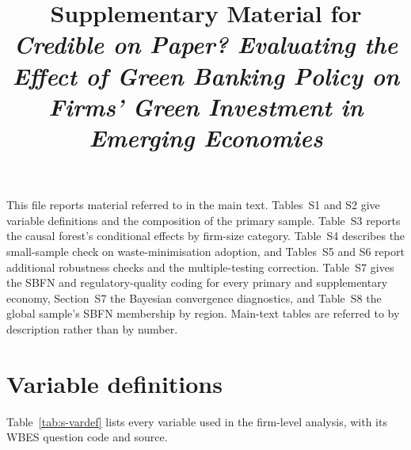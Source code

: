 \documentclass[12pt]{article}
\title{Supplementary Material for \\ \emph{Credible on Paper? Evaluating the Effect of Green Banking Policy on Firms' Green Investment in Emerging Economies}}
\author{}
\date{}
\begin{document}
\maketitle

This file reports material referred to in the main text. Tables~S1 and S2 give variable definitions and the composition of the primary sample. Table~S3 reports the causal forest's conditional effects by firm-size category. Table~S4 describes the small-sample check on waste-minimisation adoption, and Tables~S5 and S6 report additional robustness checks and the multiple-testing correction. Table~S7 gives the SBFN and regulatory-quality coding for every primary and supplementary economy, Section~S7 the Bayesian convergence diagnostics, and Table~S8 the global sample's SBFN membership by region. Main-text tables are referred to by description rather than by number.

\section{Variable definitions}
\label{sec:s-vardef}

Table~\ref{tab:s-vardef} lists every variable used in the firm-level analysis, with its WBES question code and source.
\end{document}

